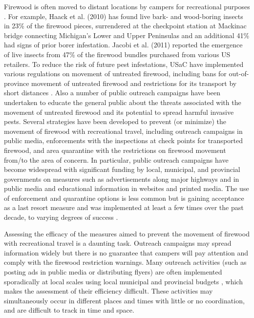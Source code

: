 Firewood is often moved to distant locations by campers for recreational purposes \cite{jacobi2011firewood,aphis}. For example, Haack et al. (2010) has found live bark- and wood-boring insects in 23\% of the firewood pieces, surrendered at the checkpoint station at Mackinac bridge connecting Michigan’s Lower and Upper Peninsulas and an additional 41\% had signs of prior borer infestation. Jacobi et al. (2011) reported the emergence of live insects from 47\% of the firewood bundles purchased from various US retailers. To reduce the risk of future pest infestations, USaC have implemented various regulations on movement of untreated firewood, including bans for out-of-province movement of untreated firewood and restrictions for its transport by short distances \cite{tobin2010does,aphis,haack2010incidence,omns}. Also a number of public outreach campaigns have been undertaken to educate the general public about the threats associated with the movement of untreated firewood and its potential to spread harmful invasive pests. Several strategies have been developed to prevent (or minimize) the movement of firewood with recreational travel, including outreach campaigns in public media, enforcements with the inspections at check points for transported firewood, and area quarantine with the restrictions on firewood movement from/to the area of concern. In particular, public outreach campaigns have become widespread with significant funding by local, municipal, and provincial governments on measures such as advertisements along major highways and in public media and educational information in websites and printed media. The use of enforcement and quarantine options is less common but is gaining acceptance as a last resort measure and was implemented at least a few times over the past decade, to varying degrees of success \cite{barlow2014modelling,koch2014using,omns}.

Assessing the efficacy of the measures aimed to prevent the movement of firewood with recreational travel is a daunting task. Outreach campaigns may spread information widely but there is no guarantee that campers will pay attention and comply with the firewood restriction warnings. Many outreach activities (such as posting ads in public media or distributing flyers) are often implemented sporadically at local scales using local municipal and provincial budgets \cite{tobin2010does}, which makes the assessment of their efficiency difficult. These activities may simultaneously occur in different places and times with little or no coordination, and are difficult to track in time and space.

